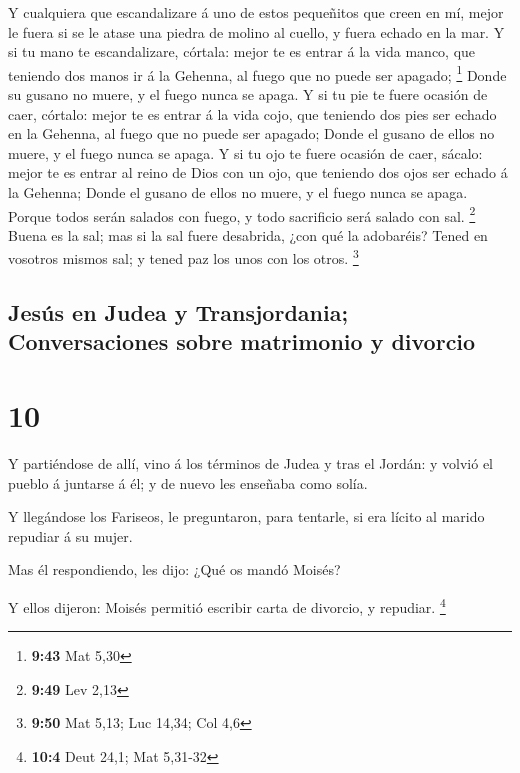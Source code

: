  Y cualquiera que escandalizare á uno de estos pequeñitos
que creen en mí, mejor le fuera si se le atase una piedra de molino al
cuello, y fuera echado en la mar.  Y si tu mano te
escandalizare, córtala: mejor te es entrar á la vida manco, que teniendo
dos manos ir á la Gehenna, al fuego que no puede ser apagado;
\footnote{\textbf{9:43} Mat 5,30}  Donde su gusano no
muere, y el fuego nunca se apaga.  Y si tu pie te fuere
ocasión de caer, córtalo: mejor te es entrar á la vida cojo, que
teniendo dos pies ser echado en la Gehenna, al fuego que no puede ser
apagado;  Donde el gusano de ellos no muere, y el fuego
nunca se apaga.  Y si tu ojo te fuere ocasión de caer,
sácalo: mejor te es entrar al reino de Dios con un ojo, que teniendo dos
ojos ser echado á la Gehenna;  Donde el gusano de ellos
no muere, y el fuego nunca se apaga.  Porque todos serán
salados con fuego, y todo sacrificio será salado con sal. \footnote{\textbf{9:49}
  Lev 2,13}  Buena es la sal; mas si la sal fuere
desabrida, ¿con qué la adobaréis? Tened en vosotros mismos sal; y tened
paz los unos con los otros. \footnote{\textbf{9:50} Mat 5,13; Luc 14,34;
  Col 4,6}

\hypertarget{jesuxfas-en-judea-y-transjordania-conversaciones-sobre-matrimonio-y-divorcio}{%
\subsection{Jesús en Judea y Transjordania; Conversaciones sobre
matrimonio y
divorcio}\label{jesuxfas-en-judea-y-transjordania-conversaciones-sobre-matrimonio-y-divorcio}}

\hypertarget{section-9}{%
\section{10}\label{section-9}}

 Y partiéndose de allí, vino á los términos de Judea y
tras el Jordán: y volvió el pueblo á juntarse á él; y de nuevo les
enseñaba como solía.

 Y llegándose los Fariseos, le preguntaron, para tentarle,
si era lícito al marido repudiar á su mujer.

 Mas él respondiendo, les dijo: ¿Qué os mandó Moisés?

 Y ellos dijeron: Moisés permitió escribir carta de
divorcio, y repudiar. \footnote{\textbf{10:4} Deut 24,1; Mat 5,31-32}

